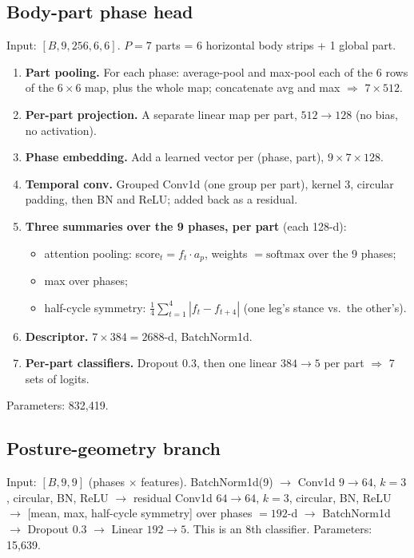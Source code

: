 \documentclass[10pt,a4paper]{article}
\begin{document}
\subsection{Body-part phase head}
Input: $[B, 9, 256, 6, 6]$. $P = 7$ parts = 6 horizontal body strips + 1 global part.
\begin{enumerate}\itemsep0pt
\item \textbf{Part pooling.} For each phase: average-pool and max-pool each of the 6 rows of the
  $6\times6$ map, plus the whole map; concatenate avg and max $\Rightarrow$ $7 \times 512$.
\item \textbf{Per-part projection.} A separate linear map per part, $512 \to 128$ (no bias, no activation).
\item \textbf{Phase embedding.} Add a learned vector per (phase, part), $9\times7\times128$.
\item \textbf{Temporal conv.} Grouped Conv1d (one group per part), kernel 3, circular padding,
  then BN and ReLU; added back as a residual.
\item \textbf{Three summaries over the 9 phases, per part} (each 128-d):
  \begin{itemize}\itemsep0pt
  \item attention pooling: score$_t = f_t \cdot a_p$, weights $= \mathrm{softmax}$ over the 9 phases;
  \item max over phases;
  \item half-cycle symmetry: $\frac{1}{4}\sum_{t=1}^{4} |f_t - f_{t+4}|$ (one leg's stance vs.\ the other's).
  \end{itemize}
\item \textbf{Descriptor.} $7 \times 384 = 2688$-d, BatchNorm1d.
\item \textbf{Per-part classifiers.} Dropout 0.3, then one linear $384 \to 5$ per part $\Rightarrow$ 7 sets of logits.
\end{enumerate}
Parameters: 832{,}419.

\subsection{Posture-geometry branch}
Input: $[B, 9, 9]$ (phases $\times$ features).
BatchNorm1d(9) $\to$ Conv1d $9\to64$, $k{=}3$, circular, BN, ReLU $\to$ residual Conv1d $64\to64$, $k{=}3$,
circular, BN, ReLU $\to$ [mean, max, half-cycle symmetry] over phases $= 192$-d $\to$ BatchNorm1d
$\to$ Dropout 0.3 $\to$ Linear $192\to5$. This is an 8th classifier.
Parameters: 15{,}639.
\end{document}
